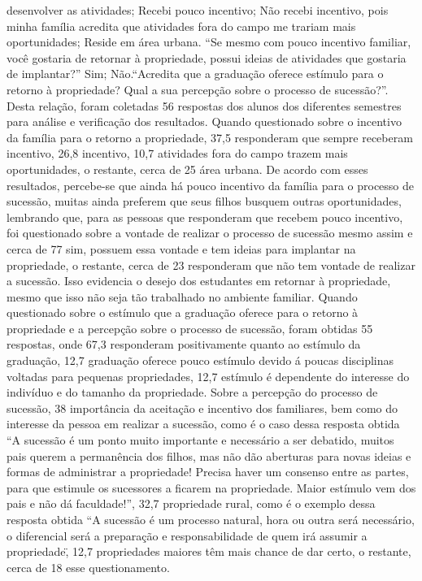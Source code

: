 desenvolver as atividades; Recebi pouco incentivo; Não recebi incentivo, pois minha família 
acredita que atividades fora do campo me trariam mais oportunidades; Reside em área urbana. “Se 
mesmo com pouco incentivo familiar, você gostaria de retornar à propriedade, possui ideias de 
atividades que gostaria de implantar?” Sim; Não.“Acredita que a graduação oferece estímulo para 
o retorno à propriedade? Qual a sua percepção sobre o processo de sucessão?”. Desta relação, 
foram coletadas 56 respostas dos alunos dos diferentes semestres para análise e verificação dos 
resultados.
Quando questionado sobre o incentivo da família para o retorno a propriedade, 37,5%
responderam que sempre receberam incentivo, 26,8%
incentivo, 10,7%
atividades fora do campo trazem mais oportunidades, o restante, cerca de 25%
área urbana. De acordo com esses resultados, percebe-se que ainda há pouco incentivo da família 
para o processo de sucessão, muitas ainda preferem que seus filhos busquem outras oportunidades, 
lembrando que, para as pessoas que responderam que recebem pouco incentivo, foi questionado 
sobre a vontade de realizar o processo de sucessão mesmo assim e cerca de 77%
sim, possuem essa vontade e tem ideias para implantar na propriedade, o restante, cerca de 23%
responderam que não tem vontade de realizar a sucessão. Isso evidencia o desejo dos estudantes 
em retornar à propriedade, mesmo que isso não seja tão trabalhado no ambiente familiar. 
Quando questionado sobre o estímulo que a graduação oferece para o retorno à propriedade 
e a percepção sobre o processo de sucessão, foram obtidas 55 respostas, onde 67,3%
responderam positivamente quanto ao estímulo da graduação, 12,7%
graduação oferece pouco estímulo devido á poucas disciplinas voltadas para pequenas 
propriedades, 12,7%
estímulo é dependente do interesse do indivíduo e do tamanho da propriedade. 
Sobre a percepção do processo de sucessão, 38%
importância da aceitação e incentivo dos familiares, bem como do interesse da pessoa em realizar 
a sucessão, como é o caso dessa resposta obtida “A sucessão é um ponto muito importante e 
necessário a ser debatido, muitos pais querem a permanência dos filhos, mas não dão aberturas 
para novas ideias e formas de administrar a propriedade! Precisa haver um consenso entre as 
partes, para que estimule os sucessores a ficarem na propriedade. Maior estímulo vem dos pais e 
não dá faculdade!”, 32,7%
propriedade rural, como é o exemplo dessa resposta obtida “A sucessão é um processo natural, 
hora ou outra será necessário, o diferencial será a preparação e responsabilidade de quem irá 
assumir a propriedade\", 12,7%
propriedades maiores têm mais chance de dar certo, o restante, cerca de 18%
esse questionamento.

